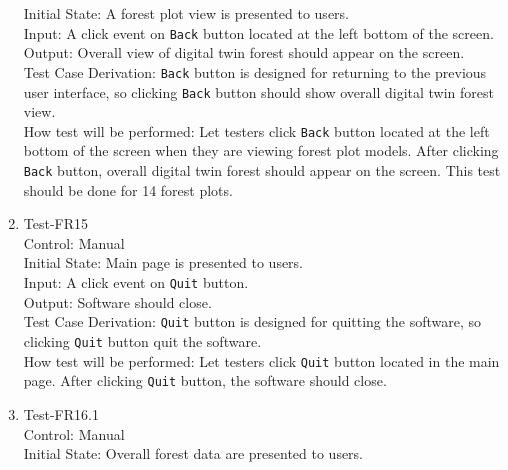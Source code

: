 \documentclass[12pt, titlepage]{article}
\begin{document}
\begin{enumerate}
Initial State: A forest plot view is presented to users.\\

Input: A click event on \verb|Back| button located at the left bottom of the screen.\\

Output: Overall view of digital twin forest should appear on the screen.\\

Test Case Derivation: \verb|Back| button is designed for returning to the 
previous user interface, so clicking \verb|Back| button should show overall digital
twin forest view. \\
					
How test will be performed:  Let testers click \verb|Back| button located at the left 
bottom of the screen when they are viewing forest plot models. After clicking \verb|Back|
button, overall digital twin forest should appear on the screen. 
This test should be done for 14 forest plots.

\item{Test-FR15\\}
Control: Manual\\ 

Initial State: Main page is presented to users.\\

Input: A click event on \verb|Quit| button.\\

Output: Software should close.\\

Test Case Derivation: \verb|Quit| button is designed for quitting the software,
so clicking \verb|Quit| button quit the software.\\
					
How test will be performed:  Let testers click \verb|Quit| button located in the main
page. After clicking \verb|Quit| button, the software should close.

\item{Test-FR16.1\\}
Control: Manual\\ 

Initial State: Overall forest data are presented to users.\\


\end{enumerate}
\end{document}
